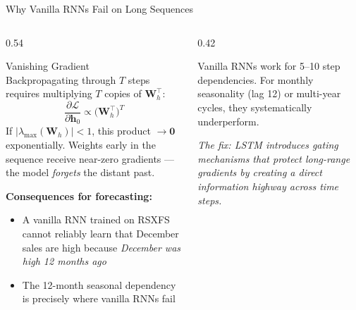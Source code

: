 \documentclass[aspectratio=169, 10pt]{beamer}
\begin{document}
\begin{frame}{Why Vanilla RNNs Fail on Long Sequences}
  \begin{columns}[T]
    \begin{column}{0.54\textwidth}
      \begin{definitionbox}{Vanishing Gradient}
        \footnotesize{}\\[-4pt]
        Backpropagating through $T$ steps requires multiplying $T$ copies
        of $\mathbf{W}_h^\top$:
        \vspace{-4pt}
        \[
          \frac{\partial \mathcal{L}}{\partial \mathbf{h}_0}
          \propto \bigl(\mathbf{W}_h^\top\bigr)^T
        \]
        \vspace{-6pt}
        If $|\lambda_{\max}(\mathbf{W}_h)| < 1$, this product $\to \mathbf{0}$
        exponentially. Weights early in the sequence receive
        near-zero gradients --- the model \emph{forgets} the distant past.
      \end{definitionbox}

      \vspace{2pt}
      \textbf{Consequences for forecasting:}
      \begin{itemize}
        \item A vanilla RNN trained on RSXFS cannot reliably learn that
              December sales are high because \emph{December was high 12
              months ago}
        \item The 12-month seasonal dependency is precisely where
              vanilla RNNs fail
      \end{itemize}
    \end{column}
    \begin{column}{0.42\textwidth}
      \begin{warningbox}
        Vanilla RNNs work for 5--10 step dependencies.
        For monthly seasonality (lag 12) or multi-year cycles,
        they systematically underperform.
      \end{warningbox}

      \smallskip
      \textit{\footnotesize
        The fix: LSTM introduces gating mechanisms that
        protect long-range gradients by creating a direct
        \emph{information highway} across time steps.}
    \end{column}
  \end{columns}

\end{frame}
\end{document}
